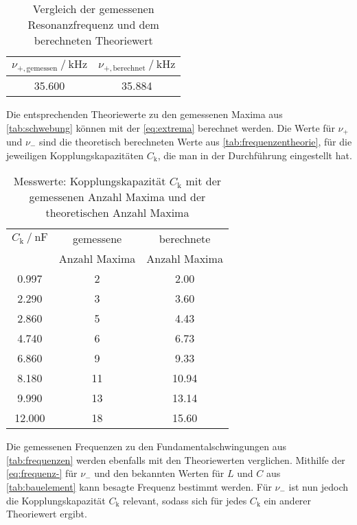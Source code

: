 \begin{table}
  \centering
  \caption{Vergleich der gemessenen Resonanzfrequenz und dem berechneten Theoriewert}
  \label{tab:resonanz}
  \begin{tabular}{c c}
    \toprule 
    $\nu _{+,\text{gemessen}} \:/\: \si{\kilo\hertz}$ & $\nu _{+,\text{berechnet}} \:/\: \si{\kilo\hertz}$    \\ 
    \midrule 
    35.600 & 35.884 \\
    \bottomrule
  \end{tabular}
\end{table}

Die entsprechenden Theoriewerte zu den gemessenen Maxima aus \autoref{tab:schwebung} können mit der \autoref{eq:extrema} berechnet werden. Die Werte für $\nu _+$ und $\nu _-$ sind die theoretisch berechneten Werte aus \autoref{tab:frequenzentheorie}, für die jeweiligen Kopplungskapazitäten $C_\text{k}$, die man in der Durchführung eingestellt hat. 

\begin{table}
  \centering
  \caption{Messwerte: Kopplungskapazität $C_\text{k}$ mit der gemessenen Anzahl Maxima und der theoretischen Anzahl Maxima }
  \label{tab:schwebungstheorie}
  \begin{tabular}{c c c}
    \toprule 
    $C_\text{k} \:/\: \si{\nano\farad}$ & gemessene & berechnete \\
     & Anzahl Maxima & Anzahl Maxima \\ 
    \midrule 
    0.997 & 2 & 2.00 \\
    2.290 & 3 & 3.60 \\
    2.860 & 5 & 4.43 \\
    4.740 & 6 & 6.73 \\
    6.860 & 9 & 9.33 \\
    8.180 & 11 & 10.94 \\
    9.990 & 13 & 13.14 \\
    12.000 & 18 & 15.60 \\
    \bottomrule
  \end{tabular}
\end{table}

Die gemessenen Frequenzen zu den Fundamentalschwingungen aus \autoref{tab:frequenzen} werden ebenfalls mit den Theoriewerten verglichen. Mithilfe der \autoref{eq:frequenz-} für $\nu _-$ und den bekannten Werten für $L$ und $C$ aus \autoref{tab:bauelement} kann besagte Frequenz bestimmt werden. Für $\nu_-$ ist nun jedoch die Kopplungskapazität $C_\text{k}$ relevant, sodass sich für jedes $C_\text{k}$ ein anderer Theoriewert ergibt.

